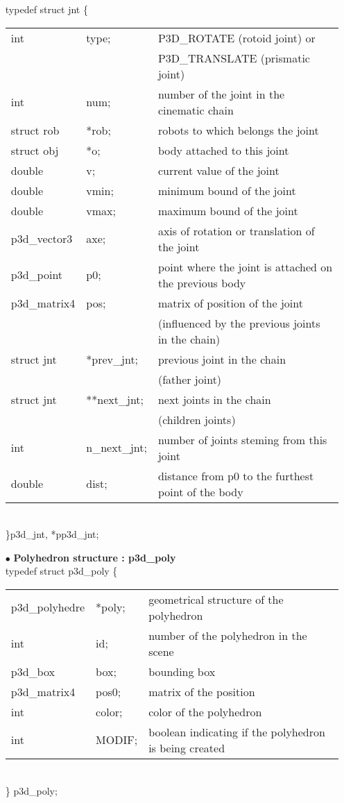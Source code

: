 \begin{itemize}
typedef struct jnt \{\\
\begin{tabular}{l l l}
  int          &  type; &  P3D\_ROTATE (rotoid joint) or\\
               &        &  P3D\_TRANSLATE (prismatic joint)\\
  int          &  num; &  number of the joint in the cinematic chain\\
  struct rob   &  *rob; &  robots to which belongs the joint\\
  struct obj   &  *o; & body attached to this joint \\
  double    &  v;   &    current value of the joint \\
  double    &  vmin; &  minimum bound of the joint \\
  double    &  vmax; & maximum bound of the joint\\
  p3d\_vector3    &  axe;  & axis of rotation or translation of the joint \\
  p3d\_point    &  p0;  & point where the joint is attached on the
previous body \\
  p3d\_matrix4  &  pos;  & matrix of position of the joint \\
                &        & (influenced by the previous joints in the chain)\\
  struct jnt   &  *prev\_jnt; & previous joint in the chain\\
               &              & (father joint)\\
  struct jnt   &  **next\_jnt; & next joints in the chain\\
               &        \     & (children joints)\\
  int          &  n\_next\_jnt; & number of joints steming from this
joint \\
  double       &  dist; & distance from p0 to the furthest point of
the body \\
\end{tabular}\\
\}p3d\_jnt, *pp3d\_jnt;\\

\item[$\bullet$]{\bf Polyhedron structure : p3d\_poly} \\

typedef struct p3d\_poly \{\\
\begin{tabular}{l l l}
  p3d\_polyhedre & *poly; &  geometrical structure of the polyhedron \\
  int & id;       &  number of the polyhedron in the scene \\
  p3d\_box & box; & bounding box\\
  p3d\_matrix4 & pos0; & matrix of the position \\
  int & color; & color of the polyhedron \\
  int & MODIF; & boolean indicating if the polyhedron is being
created\\
\end{tabular}\\
\} p3d\_poly;\\


\end{itemize}
